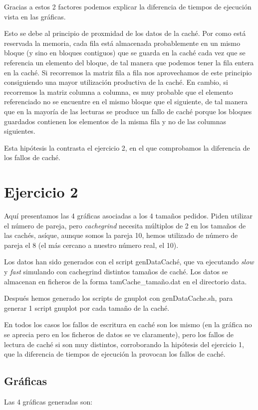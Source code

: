 \documentclass[nochap]{apuntes}
\begin{document}
Gracias a estos 2 factores podemos explicar la diferencia de tiempos de ejecución vista en las gráficas.

Esto se debe al principio de proxmidad de los datos de la caché. Por como está reservada la memoria, cada fila está almacenada probablemente en un mismo bloque (y sino en bloques contiguos) que se guarda en la caché cada vez que se referencia un elemento del bloque, de tal manera que podemos tener la fila entera en la caché. Si recorremos la matriz fila a fila nos aprovechamos de este principio consiguiendo una mayor utilización productiva de la caché. En cambio, si recorremos la matriz columna a columna, es muy probable que el elemento referenciado no se encuentre en el mismo bloque que el siguiente, de tal manera que en la mayoría de las lecturas se produce un fallo de caché porque los bloques guardados contienen los elementos de la misma fila y no de las columnas siguientes.

Esta hipótesis la contrasta el ejercicio 2, en el que comprobamos la diferencia de los fallos de caché.

\section{Ejercicio 2}

Aquí presentamos las 4 gráficas asociadas a los 4 tamaños pedidos. Piden utilizar el número de pareja, pero \emph{cachegrind} necesita múltiplos de 2 en los tamaños de las cachés, asíque, aunque somos la pareja 10, hemos utilizado de número de pareja el 8 (el más cercano a nuestro número real, el 10).

Los datos han sido generados con el script genDataCaché, que va ejecutando \emph{slow} y \emph{fast} simulando con cachegrind distintos tamaños de caché. Los datos se almacenan en ficheros de la forma tamCache\_tamaño.dat en el directorio data. 

Después hemos generado los scripts de gnuplot con genDataCache.sh, para generar 1 script gnuplot por cada tamaño de la caché.

En todos los casos los fallos de escritura en caché son los mismo (en la gráfica no se aprecia pero en los ficheros de datos se ve claramente), pero los fallos de lectura de caché si son muy distintos, corroborando la hipótesis del ejercicio 1, que la diferencia de tiempos de ejecución la provocan los fallos de caché.

\subsection{Gr\'aficas}
Las 4 gráficas generadas son:
\end{document}
